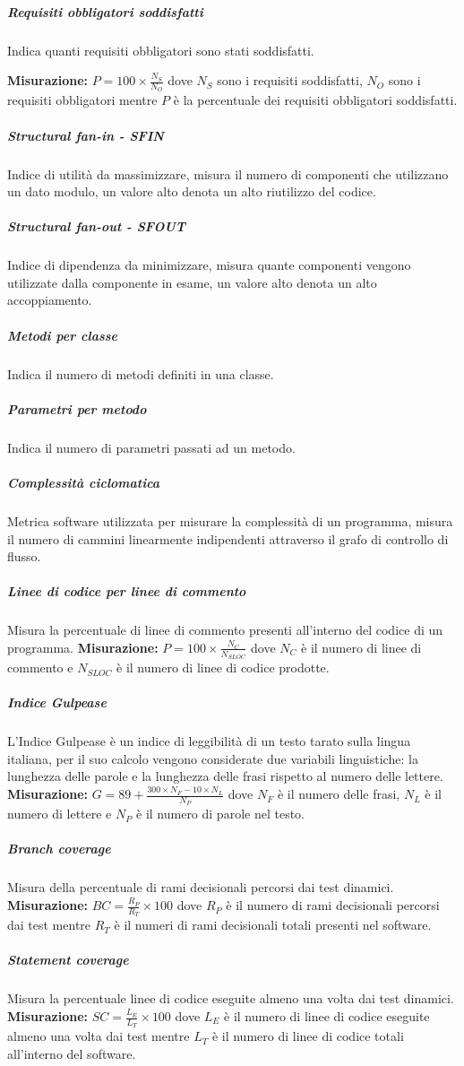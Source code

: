 \subparagraph{Requisiti obbligatori soddisfatti} \Spazio
Indica quanti requisiti obbligatori sono stati soddisfatti.

\textbf{Misurazione:} $P=100\times\frac{N_S}{N_O}$ dove $N_S$ sono i requisiti soddisfatti, $N_O$ sono i requisiti obbligatori mentre $P$ è la percentuale dei requisiti obbligatori soddisfatti.

\subparagraph{Structural fan-in - SFIN} \Spazio
Indice di utilità da massimizzare, misura il numero di componenti che utilizzano un dato modulo, un valore alto denota un alto riutilizzo del codice.

\subparagraph{Structural fan-out - SFOUT} \Spazio
Indice di dipendenza da minimizzare, misura quante componenti vengono utilizzate dalla componente in esame, un valore alto denota un alto accoppiamento.

\subparagraph{Metodi per classe} \Spazio
Indica il numero di metodi definiti in una classe.

\subparagraph{Parametri per metodo} \Spazio
Indica il numero di parametri passati ad un metodo.

\subparagraph{Complessità ciclomatica} \Spazio
Metrica software utilizzata per misurare la complessità di un programma, misura il numero di cammini linearmente indipendenti attraverso il grafo di controllo di flusso.

\subparagraph{Linee di codice per linee di commento} \Spazio
Misura la percentuale di linee di commento presenti all'interno del codice di un programma.
\textbf{Misurazione:} $P=100\times\frac{N_C}{N_{SLOC}}$ dove $N_C$ è il numero di linee di commento e $N_{SLOC}$ è il numero di linee di codice prodotte.

\subparagraph{Indice Gulpease} \Spazio
L'Indice Gulpease è un indice di leggibilità di un testo tarato sulla lingua italiana, per il suo calcolo vengono considerate due variabili linguistiche: la lunghezza delle parole e la lunghezza delle frasi rispetto al numero delle lettere.
\textbf{Misurazione:} $G=89+\frac{300\times N_F-10\times N_L}{N_P}$ dove $N_F$ è il numero delle frasi, $N_L$ è il numero di lettere e $N_P$ è il numero di parole nel testo.

\subparagraph{Branch coverage}  \Spazio
Misura della percentuale di rami decisionali percorsi dai test dinamici.
\textbf{Misurazione:} $BC=\frac{R_P}{R_T}\times 100$ dove $R_P$ è il numero di rami decisionali percorsi dai test mentre $R_T$ è il numeri di rami decisionali totali presenti nel software.

\subparagraph{Statement coverage} \Spazio
Misura la percentuale linee di codice eseguite almeno una volta dai test dinamici.
\textbf{Misurazione:} $SC=\frac{L_E}{L_T}\times 100$ dove $L_E$ è il numero di linee di codice eseguite almeno una volta dai test mentre $L_T$ è il numero di linee di codice totali all'interno del software.

